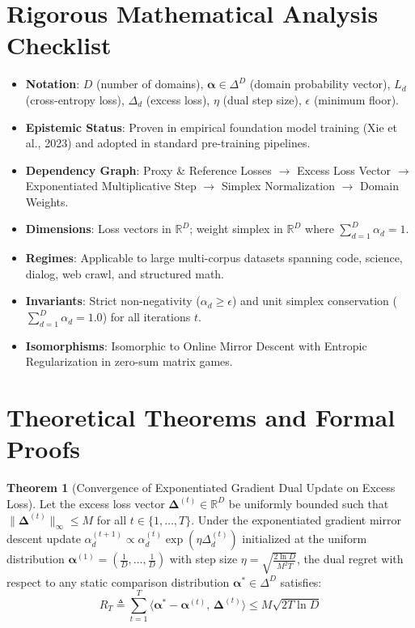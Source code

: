 \documentclass[11pt,a4paper]{article}
\theoremstyle{definition}
\newtheorem{theorem}{\textbf{Theorem}}[section]
\begin{document}
\section{Rigorous Mathematical Analysis Checklist}

\begin{itemize}
    \item \textbf{Notation}: $D$ (number of domains), $\boldsymbol{\alpha} \in \Delta^D$ (domain probability vector), $L_d$ (cross-entropy loss), $\Delta_d$ (excess loss), $\eta$ (dual step size), $\epsilon$ (minimum floor).
    \item \textbf{Epistemic Status}: Proven in empirical foundation model training (Xie et al., 2023) and adopted in standard pre-training pipelines.
    \item \textbf{Dependency Graph}: Proxy \& Reference Losses $\to$ Excess Loss Vector $\to$ Exponentiated Multiplicative Step $\to$ Simplex Normalization $\to$ Domain Weights.
    \item \textbf{Dimensions}: Loss vectors in $\mathbb{R}^D$; weight simplex in $\mathbb{R}^D$ where $\sum_{d=1}^D \alpha_d = 1$.
    \item \textbf{Regimes}: Applicable to large multi-corpus datasets spanning code, science, dialog, web crawl, and structured math.
    \item \textbf{Invariants}: Strict non-negativity ($\alpha_d \ge \epsilon$) and unit simplex conservation ($\sum_{d=1}^D \alpha_d = 1.0$) for all iterations $t$.
    \item \textbf{Isomorphisms}: Isomorphic to Online Mirror Descent with Entropic Regularization in zero-sum matrix games.
\end{itemize}

\section{Theoretical Theorems and Formal Proofs}

\begin{theorem}[Convergence of Exponentiated Gradient Dual Update on Excess Loss]
Let the excess loss vector $\boldsymbol{\Delta}^{(t)} \in \mathbb{R}^D$ be uniformly bounded such that $\|\boldsymbol{\Delta}^{(t)}\|_\infty \le M$ for all $t \in \{1, \dots, T\}$. Under the exponentiated gradient mirror descent update $\alpha_d^{(t+1)} \propto \alpha_d^{(t)} \exp(\eta \Delta_d^{(t)})$ initialized at the uniform distribution $\boldsymbol{\alpha}^{(1)} = \left(\frac{1}{D}, \dots, \frac{1}{D}\right)$ with step size $\eta = \sqrt{\frac{2 \ln D}{M^2 T}}$, the dual regret with respect to any static comparison distribution $\boldsymbol{\alpha}^* \in \Delta^D$ satisfies:
{\boldmath
\begin{equation}
R_T \triangleq \sum_{t=1}^T \langle \boldsymbol{\alpha}^* - \boldsymbol{\alpha}^{(t)}, \, \boldsymbol{\Delta}^{(t)} \rangle \le M \sqrt{2 T \ln D}
\end{equation}
}
\end{theorem}
\end{document}
